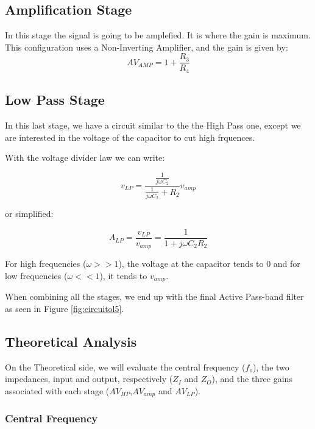 \subsection{Amplification Stage}

In this stage the signal is going to be amplefied. It is where the gain is maximum. This configuration uses a Non-Inverting Amplifier, and the gain is given by:
\begin{equation}
    AV_{AMP}=1+\frac{R_3}{R_4}
\end{equation}

\subsection{Low Pass Stage}

In this last stage, we have a circuit similar to the the High Pass one, except we are interested in the voltage of the capacitor to cut high frquences.

With the voltage divider law we can write:

\begin{equation}
    v_{LP}=\frac{\frac{1}{j \omega C_2}}{\frac{1}{j \omega C_2} + R_2}v_{amp}
\end{equation}

or simplified:

\begin{equation}
    A_{LP}=\frac{v_{LP}}{v_{amp}}=\frac{1}{1 + j \omega C_2 R_2}
\end{equation}

For high frequencies ($\omega >> 1$), the voltage at the capacitor tends to 0 and for low frequencies ($\omega << 1$), it tends to $v_{amp}$.

When combining all the stages, we end up with the final Active Pass-band filter as seen in Figure \ref{fig:circuitol5}.

\subsection{Theoretical Analysis}
\label{subsec:theo_analysis}

On the Theoretical side, we will evaluate the central frequency ($f_o$), the two impedances, input and output, respectively ($Z_I$ and $Z_O$), and the three gains associated with each stage ($AV_{HP}$,$AV_{amp}$ and $AV_{LP}$).

\subsubsection{Central Frequency}

